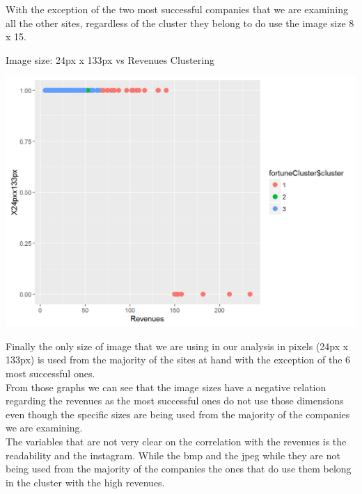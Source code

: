 \documentclass{book}
\begin{document}
With the exception of the two most successful companies that we are examining all the other sites, regardless of the cluster they belong to do use the image size 8 x 15.
\begin{table}[H]
\centering
\caption{Image size: 24px x 133px vs Revenues Clustering}
\begin{center}
\includegraphics[scale=0.4]{../R/photos/99_clust_24px.png}   \\
\end{center}
\end{table}
Finally the only size of image that we are using in our analysis  in pixels (24px x 133px) is used from the majority of the sites at hand with the exception of the 6 most successful ones.\\
From those graphs we can see that the image sizes have a negative relation regarding the revenues as the most successful ones do not use those dimensions even though the specific sizes are being used from the majority of the companies we are examining.\\
The variables that are not very clear on the correlation with the revenues is the readability and the instagram. While the bmp and the jpeg while they are not being used from the majority of the companies the ones that do use them belong in the cluster with the high revenues.
\end{document}

